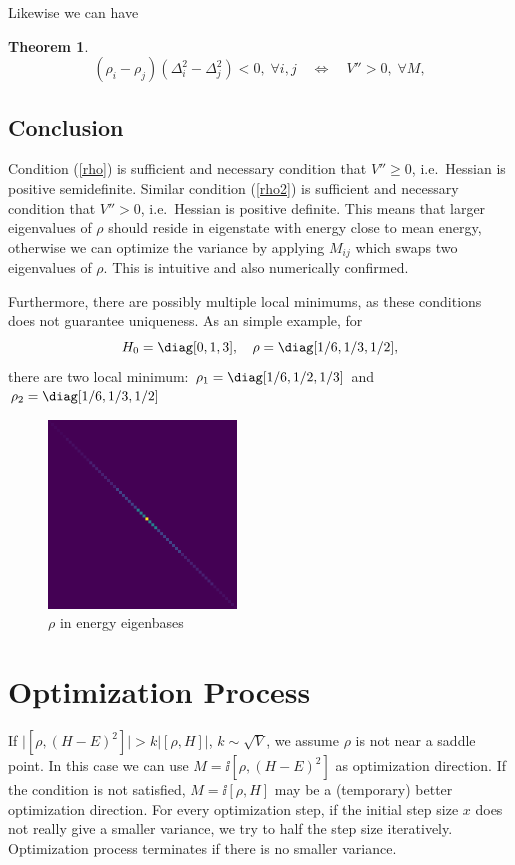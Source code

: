\documentclass[10pt]{article}
\newtheorem{theorem}{Theorem}[section]
\begin{document}
\noindent Likewise we can have
\begin{theorem}
\begin{equation}
	(\rho_i-\rho_j)(\Delta_i^2-\Delta_j^2)< 0,\; \forall i,j \quad \Leftrightarrow \quad V''>0,\;\forall M\label{rho2},
\end{equation}
\end{theorem}

\subsection{Conclusion}

Condition (\ref{rho}) is sufficient and necessary condition that $V''\geq 0$, i.e.\ Hessian is positive semidefinite. Similar condition (\ref{rho2}) is sufficient and necessary condition that $V''> 0$, i.e.\ Hessian is positive definite. This means that larger eigenvalues of $\rho$ should reside in eigenstate with energy close to mean energy, otherwise we can optimize the variance by applying $M_{ij}$ which swaps two eigenvalues of $\rho$. This is intuitive and also numerically confirmed.

Furthermore, there are possibly multiple local minimums, as these conditions does not guarantee uniqueness. As an simple example, for \[H_0=\diag[0,1,3],\quad\rho=\diag[1/6,1/3,1/2],\]there are two local minimum: $\rho_1=\diag[1/6,1/2,1/3]$ and $\rho_2=\diag[1/6,1/3,1/2]$
\begin{figure}[htb]
\centering
\includegraphics[height=5cm]{optimized.png}
\caption{$\rho$ in energy eigenbases}
\end{figure} 
\section{Optimization Process}
If $\big|[\rho, (H-E)^2]\big|>k\big|[\rho, H]\big|$, $k\sim\sqrt{V}$, we assume $\rho$ is not near a saddle point. In this case we can use $M=\ii[\rho, (H-E)^2]$ as optimization direction. If the condition is not satisfied, $M=\ii [\rho, H]$ may be a (temporary) better optimization direction. For every optimization step, if the initial step size $x$ does not really give a smaller variance, we try to half the step size iteratively. Optimization process terminates if there is no smaller variance. 
\end{document}
